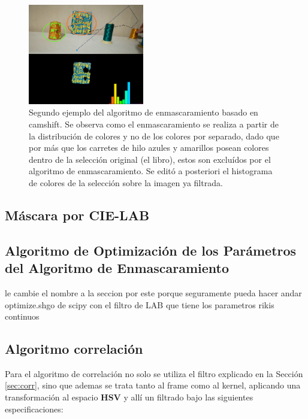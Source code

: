 \begin{figure}[H]
\centering
	\includegraphics[width=0.45\textwidth]{Imagenes/camshift_mask2.png}
	\caption{Segundo ejemplo del algoritmo de enmascaramiento basado en camshift. Se observa como el enmascaramiento se realiza a partir de la distribución de colores y no de los colores por separado, dado que por más que los carretes de hilo azules y amarillos posean colores dentro de la selección original (el libro), estos son excluídos por el algoritmo de enmascaramiento. Se editó a posteriori el histograma de colores de la selección sobre la imagen ya filtrada.}
	\label{fig:c_mask2}
\end{figure}
\subsection{Máscara por CIE-LAB}



\subsection{Algoritmo de Optimización de los Parámetros del Algoritmo de Enmascaramiento}
\large{le cambie el nombre a la seccion por este porque seguramente pueda hacer andar optimize.shgo de scipy con el filtro de LAB que tiene los parametros rikis continuos}
\subsection{Algoritmo correlación}
Para el algoritmo de correlación no solo se utiliza el filtro explicado en la Sección \ref{sec:corr}, sino que ademas se trata tanto al frame como al kernel, aplicando una transformación al espacio \textbf{HSV} y allí un filtrado bajo las siguientes especificaciones: 
            
